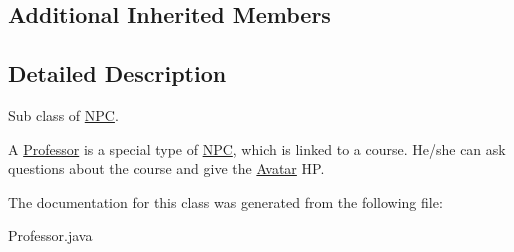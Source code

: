 \subsection*{Additional Inherited Members}


\subsection{Detailed Description}
Sub class of \hyperlink{classNPC}{N\+P\+C}. 

A \hyperlink{classProfessor}{Professor} is a special type of \hyperlink{classNPC}{N\+P\+C}, which is linked to a course. He/she can ask questions about the course and give the \hyperlink{classAvatar}{Avatar} H\+P. 

The documentation for this class was generated from the following file\+:\begin{DoxyCompactItemize}
\item 
Professor.\+java\end{DoxyCompactItemize}
